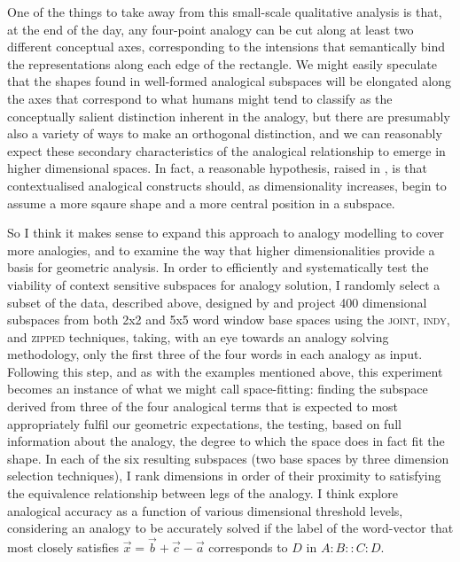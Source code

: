 One of the things to take away from this small-scale qualitative analysis is that, at the end of the day, any four-point analogy can be cut along at least two different conceptual axes, corresponding to the intensions that semantically bind the representations along each edge of the rectangle.  We might easily speculate that the shapes found in well-formed analogical subspaces will be elongated along the axes that correspond to what humans might tend to classify as the conceptually salient distinction inherent in the analogy, but there are presumably also a variety of ways to make an orthogonal distinction, and we can reasonably expect these secondary characteristics of the analogical relationship to emerge in higher dimensional spaces.  In fact, a reasonable hypothesis, raised in \cite{McGregorEA2016}, is that contextualised analogical constructs should, as dimensionality increases, begin to assume a more sqaure shape and a more central position in a subspace.

So I think it makes sense to expand this approach to analogy modelling to cover more analogies, and to examine the way that higher dimensionalities provide a basis for geometric analysis.  In order to efficiently and systematically test the viability of context sensitive subspaces for analogy solution, I randomly select a subset of the data, described above, designed by \cite{MikolovEA2013b} and project 400 dimensional subspaces from both 2x2 and 5x5 word window base spaces using the \textsc{joint}, \textsc{indy}, and \textsc{zipped} techniques, taking, with an eye towards an analogy solving methodology, only the first three of the four words in each analogy as input.  Following this step, and as with the examples mentioned above, this experiment becomes an instance of what we might call space-fitting: finding the subspace derived from three of the four analogical terms that is expected to most appropriately fulfil our geometric expectations, the testing, based on full information about the analogy, the degree to which the space does in fact fit the shape.  In each of the six resulting subspaces (two base spaces by three dimension selection techniques), I rank dimensions in order of their proximity to satisfying the equivalence relationship between legs of the analogy.  I think explore analogical accuracy as a function of various dimensional threshold levels, considering an analogy to be accurately solved if the label of the word-vector that most closely satisfies $\overrightarrow{x} = \overrightarrow{b} + \overrightarrow{c} - \overrightarrow{a}$ corresponds to $D$ in $A:B::C:D$.


